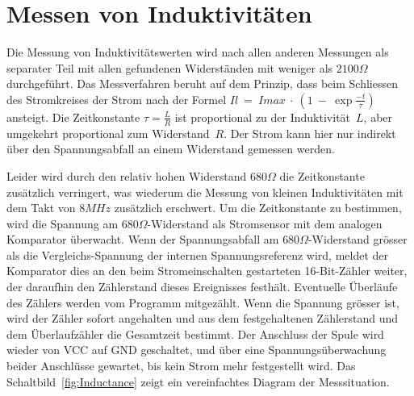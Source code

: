 \section{Messen von Induktivitäten}
Die Messung von Induktivitätswerten wird nach allen anderen Messungen als separater Teil mit allen
gefundenen Widerständen mit weniger als \(2100\Omega\) durchgeführt.
Das Messverfahren beruht auf dem Prinzip, dass beim Schliessen des Stromkreises der Strom nach
der Formel \(Il~=~Imax~\cdot~(1~-~\exp{\frac{-t}{\tau}})\) ansteigt.
Die Zeitkonstante \(\tau = \frac{L}{R}\) ist proportional zu der Induktivität~\(L\), aber umgekehrt
proportional zum Widerstand~\(R\). 
Der Strom kann hier nur indirekt über den Spannungsabfall an einem Widerstand
gemessen werden.

Leider wird durch den relativ hohen Widerstand \(680\Omega\) die Zeitkonstante zusätzlich verringert, was
wiederum die Messung von kleinen Induktivitäten mit dem Takt von \(8MHz\) zusätzlich erschwert.
Um die Zeitkonstante zu bestimmen, wird die Spannung am \(680\Omega\)-Widerstand als Stromsensor
mit dem analogen Komparator überwacht. Wenn der Spannungsabfall am \(680\Omega\)-Widerstand grösser als
die Vergleichs-Spannung der internen Spannungsreferenz wird, meldet der Komparator dies an den beim
Stromeinschalten gestarteten 16-Bit-Zähler weiter, der daraufhin den Zählerstand dieses
Ereignisses festhält. Eventuelle Überläufe des Zählers werden vom Programm mitgezählt. 
Wenn die Spannung grösser ist, wird der Zähler sofort angehalten und aus dem festgehaltenen Zählerstand und
dem Überlaufzähler die Gesamtzeit bestimmt.
Der Anschluss der Spule wird wieder von VCC auf GND geschaltet, und über eine Spannungsüberwachung beider
Anschlüsse gewartet, bis kein Strom mehr festgestellt wird.
Das Schaltbild~\ref{fig:Inductance} zeigt ein vereinfachtes Diagram der Messsituation.

